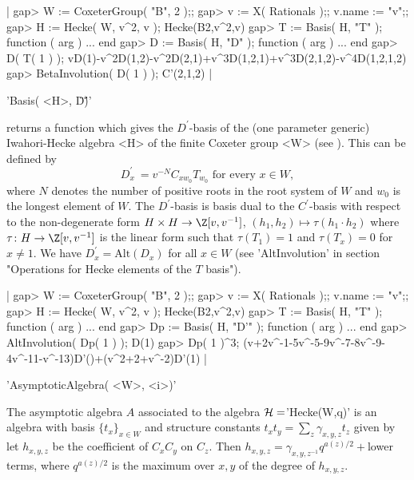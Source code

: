 |    gap> W := CoxeterGroup( "B", 2 );;
    gap> v := X( Rationals );; v.name := "v";;
    gap> H := Hecke( W, v^2, v );
    Hecke(B2,v^2,v)
    gap> T := Basis( H, "T" );
    function ( arg ) ... end
    gap> D := Basis( H, "D" );
    function ( arg ) ... end
    gap> D( T( 1 ) );
    vD(1)-v^2D(1,2)-v^2D(2,1)+v^3D(1,2,1)+v^3D(2,1,2)-v^4D(1,2,1,2)
    gap> BetaInvolution( D( 1 ) );
    C'(2,1,2) |


'Basis( <H>, \"D\'\" )'

returns  a function which gives the  $D^\prime$-basis of the (one parameter
generic)  Iwahori-Hecke algebra  <H> of  the finite  Coxeter group <W> (see
\cite[(5.1)]{Lus85}).   This   can   be   defined   by  $$  D_x^\prime  \:=
v^{-N}C_{xw_0}  T_{w_0} \mbox{ for  every $x \in  W$}, $$ where $N$ denotes
the  number of positive  roots in the  root system of  $W$ and $w_0$ is the
longest  element  of  $W$.  The  $D^\prime$-basis  is  basis  dual  to  the
$C^\prime$-basis  with  respect  to  the  non-degenerate  form  $H \times H
\rightarrow  \Z[v,v^{-1}]$, $(h_1,h_2)  \mapsto \tau(h_1  \cdot h_2)$ where
$\tau  \colon  H  \rightarrow  \Z[v,v^{-1}]$  is  the linear form such that
$\tau(T_1)=1$ and $\tau(T_x)=0$ for $x \ne 1$. We have
$D_x^\prime=\text{Alt}(D_x)$  for  all  $x  \in  W$ (see 'AltInvolution' in
section "Operations for Hecke elements of the $T$ basis").

|    gap> W := CoxeterGroup( "B", 2 );;
    gap> v := X( Rationals );; v.name := "v";;
    gap> H := Hecke( W, v^2, v );
    Hecke(B2,v^2,v)
    gap> T := Basis( H, "T" );
    function ( arg ) ... end
    gap> Dp := Basis( H, "D'" );
    function ( arg ) ... end
    gap> AltInvolution( Dp( 1 ) );
    D(1)
    gap> Dp( 1 )^3;
    (v+2v^-1-5v^-5-9v^-7-8v^-9-4v^-11-v^-13)D'()+(v^2+2+v^-2)D'(1) |


'AsymptoticAlgebra( <W>, <i>)'

The  asymptotic algebra $A$ associated to the algebra ${\mathcal H}=$'Hecke(W,q)' is
an   algebra  with   basis  $\{t_x\}_{x\in   W}$  and  structure  constants
$t_xt_y=\sum_z\gamma_{x,y,z}   t_z$  given  by\:  let  $h_{x,y,z}$  be  the
coefficient  of  $C_x  C_y$  on  $C_z$. Then $h_{x,y,z}=\gamma_{x,y,z^{-1}}
q^{a(z)/2}+$lower  terms, where $q^{a(z)/2}$  is the maximum  over $x,y$ of
the degree of $h_{x,y,z}$.

